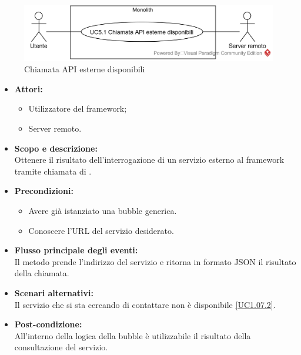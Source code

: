 \begin{samepage}
\isfirsttrue
{}
\nopagebreak
\begin{figure}[H]
	\centering
	\includegraphics[width=15cm]{../../documenti/AnalisiDeiRequisiti/Diagrammi_img/usecase/uc1_07.png}
	\caption{\UCCCaption{} Chiamata API esterne disponibili}
\end{figure}
\end{samepage}

\begin{itemize}
	\item \textbf{Attori:}
	\begin{itemize}
		\item Utilizzatore del framework;
		\item Server remoto.
	\end{itemize}
	\item \textbf{Scopo e descrizione:} 
	\\Ottenere il risultato dell'interrogazione di un servizio esterno al framework tramite chiamata di .
	\item \textbf{Precondizioni:}
	\begin{itemize}
		\item Avere già istanziato una bubble generica.
		\item Conoscere l'URL del servizio desiderato.
	\end{itemize}
	\item \textbf{Flusso principale degli eventi:}
	\\Il metodo prende l'indirizzo del servizio e ritorna in formato JSON il risultato della chiamata.
	\item \textbf{Scenari alternativi:}
	\\Il servizio che si sta cercando di contattare non è disponibile \ref{UC1.07.2}.
	\item \textbf{Post-condizione:}
	\\All'interno della logica della bubble è utilizzabile il risultato della consultazione del servizio.
\end{itemize}


